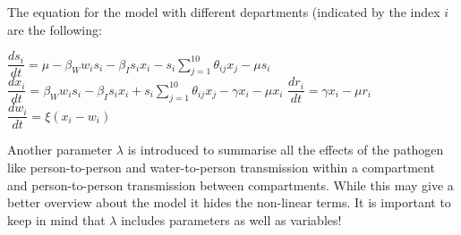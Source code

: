 \documentclass[11pt]{article}
\begin{document}
The equation for the model with different departments (indicated by the index $ i $ are the following:
\begin{center}
$ \dfrac{ds_{i}}{dt}=\mu -\beta_{W}w_{i}s_{i}-\beta_{I}s_{i}x_{i}-s_{i}\sum_{j=1}^{10}\theta_{ij}x_{j}-\mu s_{i} $
\linebreak
$ \dfrac{dx_{i}}{dt}=\beta_{W}w_{i}s_{i}-\beta_{I}s_{i}x_{i}+s_{i}\sum_{j=1}^{10}\theta_{ij}x_{j}
-\gamma x_{i}-\mu x_{i} $
\linebreak
$ \dfrac{dr_{i}}{dt}=\gamma x_{i}-\mu r_{i} $
\linebreak
$ \dfrac{dw_{i}}{dt}=\xi (x_{i}-w_{i}) $
\linebreak
\end{center}
Another parameter $ \lambda $ is introduced to summarise all the effects of the pathogen like person-to-person and water-to-person transmission within a compartment and person-to-person transmission between compartments. While this may give a better overview about the model it hides the non-linear terms. It is important to keep in mind that $ \lambda $ includes parameters as well as variables! 
\end{document}
